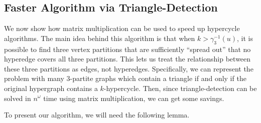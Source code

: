 \documentclass[11pt,letterpaper,pdftex]{article}
\begin{document}
\subsection{Faster Algorithm via Triangle-Detection} \label{subsec:triangle_detection}

We now show how matrix multiplication can be used to speed up hypercycle algorithms.
The main idea behind this algorithm is that when $k>\gamma_3^{-1}(u)$, it is possible to find three vertex partitions that are sufficiently ``spread out'' that no hyperedge covers all three partitions. This lets us treat the relationship between these three partitions as edges, not hyperedges. Specifically, we can represent the problem with many $3$-partite graphs which contain a triangle if and only if the original hypergraph contains a $k$-hypercycle. 
Then, since triangle-detection can be solved in $n^\omega$ time using matrix multiplication, we can get some savings.

To present our algorithm, we will need the following lemma.
\end{document}
